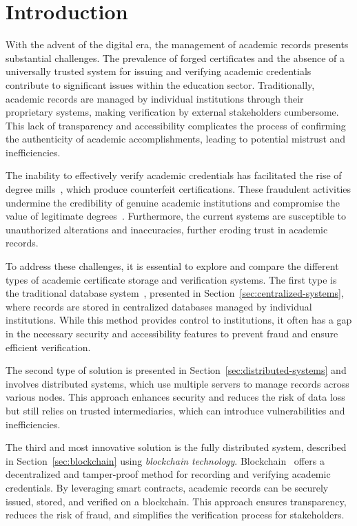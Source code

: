 %
%
\chapter{Introduction}\label{chap:introduction}

With the advent of the digital era, the management of academic records presents substantial challenges. The prevalence of forged certificates and the absence of a universally trusted system for issuing and verifying academic credentials contribute to significant issues within the education sector. Traditionally, academic records are managed by individual institutions through their proprietary systems, making verification by external stakeholders cumbersome. This lack of transparency and accessibility complicates the process of confirming the authenticity of academic accomplishments, leading to potential mistrust and inefficiencies.

The inability to effectively verify academic credentials has facilitated the rise of degree mills~\cite{saleh2020blockchain}, which produce counterfeit certifications. These fraudulent activities undermine the credibility of genuine academic institutions and compromise the value of legitimate degrees~\cite{muzammil2010corrupt}. Furthermore, the current systems are susceptible to unauthorized alterations and inaccuracies, further eroding trust in academic records.

To address these challenges, it is essential to explore and compare the different types of academic certificate storage and verification systems. The first type is the traditional database system~\cite{OLSON200971}, presented in Section~\ref{sec:centralized-systems}, where records are stored in centralized databases managed by individual institutions.
While this method provides control to institutions, it often has a gap in the necessary security and accessibility features to prevent fraud and ensure efficient verification.

The second type of solution is presented in Section~\ref{sec:distributed-systems} and involves distributed systems, which use multiple servers to manage records across various nodes.
This approach enhances security and reduces the risk of data loss but still relies on trusted intermediaries, which can introduce vulnerabilities and inefficiencies.

The third and most innovative solution is the fully distributed system, described in Section~\ref{sec:blockchain} using \textit{blockchain technology}. Blockchain~\cite{saleh2020blockchain} offers a decentralized and tamper-proof method for recording and verifying academic credentials.
By leveraging smart contracts, academic records can be securely issued, stored, and verified on a blockchain. This approach ensures transparency, reduces the risk of fraud, and simplifies the verification process for stakeholders.


